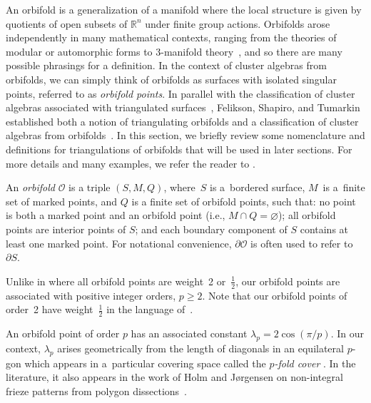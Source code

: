 \documentclass[11pt]{article}
\numberwithin{equation}{section}
\begin{document}
An orbifold is a generalization of a manifold where the local structure is given by quotients of open subsets of $\mathbb{R}^n$ under finite group actions. Orbifolds arose independently in many mathematical contexts, ranging from the theories of modular or automorphic forms \cite{Satake} to $3$-manifold theory~\cite{Thurston}, and so there are many possible phrasings for a definition. In the context of cluster algebras from orbifolds, we can simply think of orbifolds as surfaces with isolated singular points, referred to as \emph{orbifold points}.
In parallel with the classification of cluster algebras associated with triangulated surfaces~\cite{FST-triangulatedSurfaces, FT-II}, Felikson, Shapiro, and Tumarkin established both a notion of triangulating orbifolds and a classification of cluster algebras from orbifolds~\cite{FST-orbTriang}. In this section, we briefly review some nomenclature and definitions for triangulations of orbifolds that will be used in later sections. For more details and many examples, we refer the reader to \cite[Section~4]{FST-orbTriang}.

\begin{Definition}
An \emph{orbifold} $\mathcal{O}$ is a triple $(S,M,Q)$, where~$S$ is a~bordered surface, $M$~is a~finite set of marked points, and $Q$ is a finite set of orbifold points, such that: no point is both a marked point and an orbifold point (i.e., $M \cap Q = \varnothing$); all orbifold points are interior points of $S$; and each boundary component of $S$ contains at least one marked point. For notational convenience, $\partial \mathcal{O}$ is often used to refer to $\partial S$.
\end{Definition}

\begin{Remark}
Unlike in \cite{Felikson-Shapiro-Tumarkin} where all orbifold points are weight~2 or~$\frac12$, our orbifold points are associated with positive integer orders, $p \geq 2$. Note that our orbifold points of order~2 have weight~$\frac12$ in the language of~\cite{Felikson-Shapiro-Tumarkin}.
\end{Remark}

An orbifold point of order $p$ has an associated constant $\lambda_p = 2\cos(\pi/p)$. In our context, $\lambda_p$ arises geometrically from the length of diagonals in an equilateral $p$-gon which appears in a~particular covering space called the \emph{$p$-fold cover} \cite{Chekhov-Shapiro, L-FV}. In the literature, it also appears in the work of Holm and J{\o}rgensen on non-integral frieze patterns from polygon dissections~\cite{HJ}.
\end{document}
